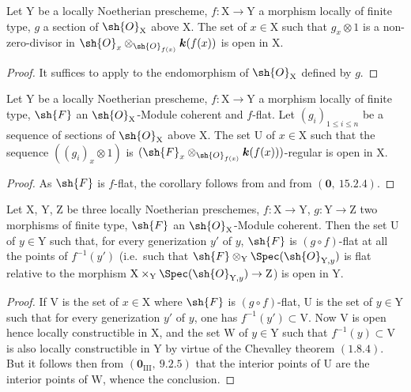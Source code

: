 \begin{corollary}[11.1.3]
\label{IV.11.1.3}
Let $\mathrm{Y}$ be a locally Noetherian prescheme, $f:\mathrm{X}\to\mathrm{Y}$ a morphism locally of finite type, $g$ a section of $\sh{O}_\mathrm{X}$ above $\mathrm{X}$. The set of $x\in\mathrm{X}$ such that $g_x\otimes 1$ is a non-zero-divisor in $\sh{O}_x\otimes_{\sh{O}_{f(x)}}\boldsymbol{k}(f(x))$ is open in $\mathrm{X}$.
\end{corollary}

\begin{proof}
It suffices to apply  to the endomorphism of $\sh{O}_\mathrm{X}$ defined by $g$.
\end{proof}

\begin{corollary}[11.1.4]
\label{IV.11.1.4}
Let $\mathrm{Y}$ be a locally Noetherian prescheme, $f:\mathrm{X}\to\mathrm{Y}$ a morphism locally of finite type, $\sh{F}$ an $\sh{O}_\mathrm{X}$-Module coherent and $f$-flat. Let $(g_i)_{1\leqslant i\leqslant n}$ be a sequence of sections of $\sh{O}_\mathrm{X}$ above $\mathrm{X}$. The set $\mathrm{U}$ of $x\in\mathrm{X}$ such that the sequence $((g_i)_x\otimes 1)$ is $(\sh{F}_x\otimes_{\sh{O}_{f(x)}}\boldsymbol{k}(f(x)))$-regular is open in $\mathrm{X}$.
\end{corollary}

\begin{proof}
As $\sh{F}$ is $f$-flat, the corollary follows from  and from $(\mathbf{0},~15.2.4)$.
\end{proof}

\begin{corollary}[11.1.5]
\label{IV.11.1.5}
Let $\mathrm{X}$, $\mathrm{Y}$, $\mathrm{Z}$ be three locally Noetherian preschemes, $f:\mathrm{X}\to\mathrm{Y}$, $g:\mathrm{Y}\to\mathrm{Z}$ two morphisms of finite type, $\sh{F}$ an $\sh{O}_\mathrm{X}$-Module coherent. Then the set $\mathrm{U}$ of $y\in\mathrm{Y}$ such that, for every generization $y'$ of $y$, $\sh{F}$ is $(g\circ f)$-flat at all the points of $f^{-1}(y')$ (i.e.\ such that $\sh{F}\otimes_\mathrm{Y}\Spec(\sh{O}_{\mathrm{Y},y})$ is flat relative to the morphism $\mathrm{X}\times_\mathrm{Y}\Spec(\sh{O}_{\mathrm{Y},y})\to\mathrm{Z}$) is open in $\mathrm{Y}$.
\end{corollary}

\begin{proof}
If $\mathrm{V}$ is the set of $x\in\mathrm{X}$ where $\sh{F}$ is $(g\circ f)$-flat, $\mathrm{U}$ is the set of $y\in\mathrm{Y}$ such that for every generization $y'$ of $y$, one has $f^{-1}(y')\subset\mathrm{V}$. Now $\mathrm{V}$ is open  hence locally constructible in $\mathrm{X}$, and the set $\mathrm{W}$ of $y\in\mathrm{Y}$ such that $f^{-1}(y)\subset\mathrm{V}$ is also locally constructible in $\mathrm{Y}$ by virtue of the Chevalley theorem $(1.8.4)$. But it follows then from $(\mathbf{0}_{\mathrm{III}},~9.2.5)$ that the interior points of $\mathrm{U}$ are the interior points of $\mathrm{W}$, whence the conclusion.
\end{proof}


